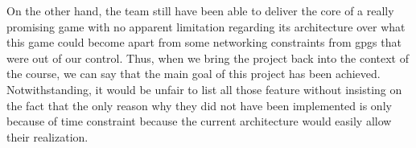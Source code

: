 On the other hand, the team still have been able to deliver the core of a really promising game with no apparent limitation regarding its architecture over what this game could become apart from some networking constraints from \gls{gpgs} that were out of our control. Thus, when we bring the project back into the context of the course, we can say that the main goal of this project has been achieved. Notwithstanding, it would be unfair to list all those feature without insisting on the fact that the only reason why they did not have been implemented is only because of time constraint because the current architecture would easily allow their realization. 
